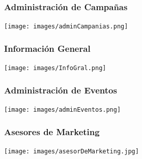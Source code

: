 \documentclass[oneside]{book}
\begin{document}
\subsubsection{Administraci\'{o}n de Campañas}
\medskip
\texttt{[image: images/adminCampanias.png]}
\bigskip

\subsubsection{Informaci\'{o}n General}
\medskip
\texttt{[image: images/InfoGral.png]}
\bigskip

\subsubsection{Administraci\'{o}n de Eventos}
\medskip
\texttt{[image: images/adminEventos.png]}
\bigskip


\subsubsection{Asesores de Marketing}
\medskip
\texttt{[image: images/asesorDeMarketing.jpg]}
\bigskip










\end{document}
